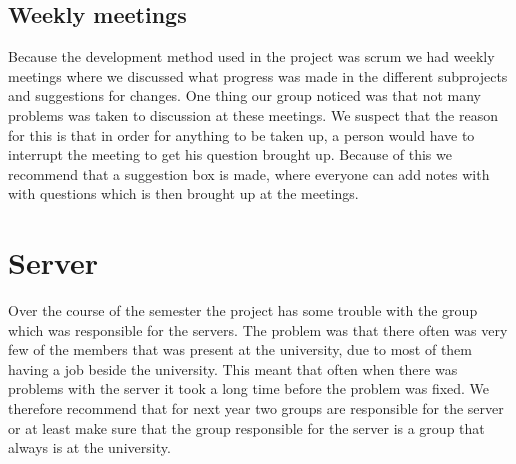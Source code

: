 \subsection{Weekly meetings}
Because the development method used in the project was scrum we had weekly meetings where we discussed what progress was made in the different subprojects and suggestions for changes. One thing our group noticed was that not many problems was taken to discussion at these meetings. We suspect that the reason for this is that in order for anything to be taken up, a person would have to interrupt the meeting to get his question brought up. Because of this we recommend that a suggestion box is made, where everyone can add notes with with questions which is then brought up at the meetings.

\section{Server}
Over the course of the semester the project has some trouble with the group which was responsible for the servers. The problem was that there often was very few of the members that was present at the university, due to most of them having a job beside the university. This meant that often when there was problems with the server it took a long time before the problem was fixed. We therefore recommend that for next year two groups are responsible for the server or at least make sure that the group responsible for the server is a group that always is at the university.
